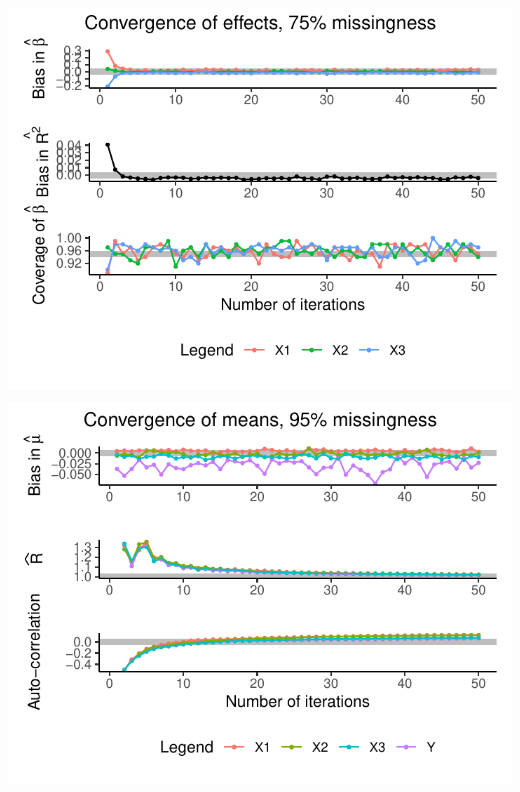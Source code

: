\documentclass[Royal,times,sageh]{sagej}
\begin{document}
\begin{flushleft}\includegraphics{manuscript_files/figure-latex/unnamed-chunk-13-1} \end{flushleft}

\begin{flushleft}\includegraphics{manuscript_files/figure-latex/unnamed-chunk-15-1} \end{flushleft}
\end{document}
